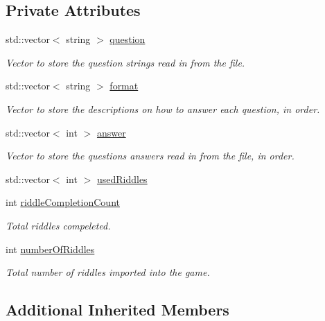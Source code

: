 \subsection*{Private Attributes}
\begin{DoxyCompactItemize}
\item 
std\-::vector$<$ string $>$ \hyperlink{classCodeCracker_ae578bd328ef64ed314b19e5940247f2c}{question}
\begin{DoxyCompactList}\small\item\em Vector to store the question strings read in from the file. \end{DoxyCompactList}\item 
std\-::vector$<$ string $>$ \hyperlink{classCodeCracker_a6ab76d405fa6a989fdd10c7641f6bc4e}{format}
\begin{DoxyCompactList}\small\item\em Vector to store the descriptions on how to answer each question, in order. \end{DoxyCompactList}\item 
std\-::vector$<$ int $>$ \hyperlink{classCodeCracker_a2084c27e05ec80c44263cb2f9a54d8c4}{answer}
\begin{DoxyCompactList}\small\item\em Vector to store the questions answers read in from the file, in order. \end{DoxyCompactList}\item 
std\-::vector$<$ int $>$ \hyperlink{classCodeCracker_a9b54be5b85162c25c8e42ce1e865882a}{used\-Riddles}
\item 
int \hyperlink{classCodeCracker_aca60d7cc01bda0ec6782984e46b9b357}{riddle\-Completion\-Count}
\begin{DoxyCompactList}\small\item\em Total riddles compeleted. \end{DoxyCompactList}\item 
int \hyperlink{classCodeCracker_a30671a1b282dc98361938283fbafcf6e}{number\-Of\-Riddles}
\begin{DoxyCompactList}\small\item\em Total number of riddles imported into the game. \end{DoxyCompactList}\end{DoxyCompactItemize}
\subsection*{Additional Inherited Members}


